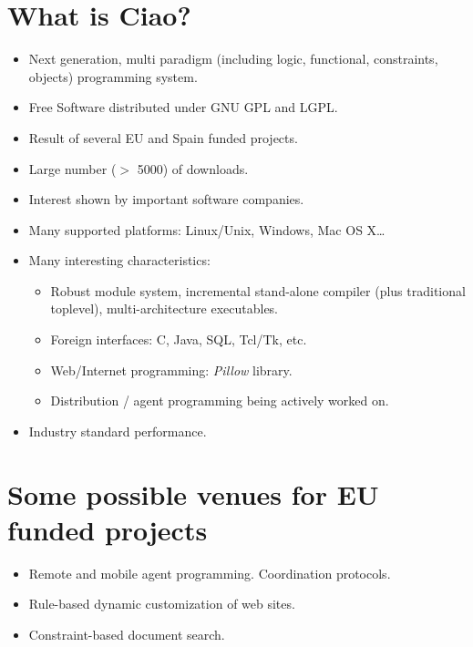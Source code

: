 \documentclass[12pt]{article}
\newcommand{\ciao}{\psfig{figure=ciao_st.ps}}
\begin{document}
\topmargin -40pt

\Large

\centerline{\ciao}

\vspace*{-0.5cm}
\section*{What is Ciao?}
\vspace*{-0.5cm}

\begin{itemize}
  
\item Next generation, multi paradigm (including logic, functional,
  constraints, objects) programming system.


\item Free Software distributed under GNU GPL and LGPL.

\item Result of several EU and Spain funded projects.

\item Large number ($>$ 5000) of downloads.

\item Interest shown by important software companies.

\item Many supported platforms: Linux/Unix, Windows, Mac OS X\ldots


\item Many interesting characteristics:
  \begin{itemize}
  \item Robust module system, incremental stand-alone compiler (plus
    traditional toplevel), multi-architecture executables.
  \item Foreign interfaces: C, Java, SQL, Tcl/Tk, etc.
  \item Web/Internet programming: \emph{Pillow} library.
  \item Distribution / agent programming being actively worked on.
  \end{itemize}

\item Industry standard performance.

\end{itemize}

\vspace*{-0.9cm}
\section*{Some possible venues for EU funded projects}
\vspace*{-0.5cm}
\begin{itemize}
\item  Remote and mobile agent programming. Coordination protocols.

\item  Rule-based dynamic customization of web sites.

\item  Constraint-based document search.
\end{itemize}
\end{document}
